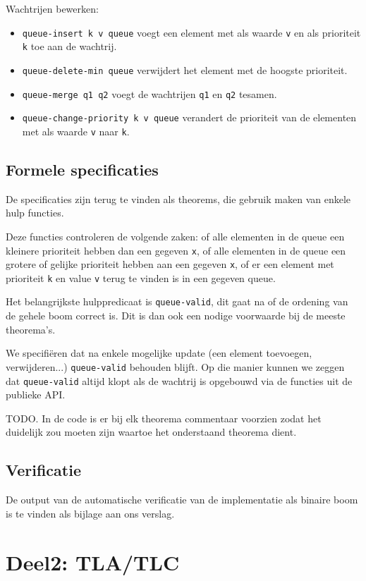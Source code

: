 \documentclass[a4paper,10pt]{article}
\begin{document}
Wachtrijen bewerken:

\begin{itemize}
    \item \texttt{queue-insert k v queue} voegt een element met als waarde
    \texttt{v} en als prioriteit \texttt{k} toe aan de wachtrij.
    \item \texttt{queue-delete-min queue} verwijdert het element met de hoogste
    prioriteit.
    \item \texttt{queue-merge q1 q2} voegt de wachtrijen \texttt{q1} en
    \texttt{q2} tesamen.
    \item \texttt{queue-change-priority k v queue} verandert de prioriteit van
    de elementen met als waarde \texttt{v} naar \texttt{k}.
\end{itemize}

\subsection{Formele specificaties}

De specificaties zijn terug te vinden als theorems, die gebruik maken van enkele
hulp functies.

Deze functies controleren de volgende zaken: of alle elementen in de queue een
kleinere prioriteit hebben dan een gegeven \texttt{x}, of alle elementen in de
queue een grotere of gelijke prioriteit hebben aan een gegeven \texttt{x}, of er
een element met prioriteit \texttt{k} en value \texttt{v} terug te vinden is in
een gegeven queue.

Het belangrijkste hulppredicaat is \texttt{queue-valid}, dit gaat na of de
ordening van de gehele boom correct is. Dit is dan ook een nodige voorwaarde bij
de meeste theorema's.

We specifi\"eren dat na enkele mogelijke update (een element toevoegen,
verwijderen...) \texttt{queue-valid} behouden blijft. Op die manier kunnen we
zeggen dat \texttt{queue-valid} altijd klopt als de wachtrij is opgebouwd via de
functies uit de publieke API.

TODO. In de code is er bij elk theorema commentaar voorzien zodat het duidelijk
zou moeten zijn waartoe het onderstaand theorema dient.

\subsection{Verificatie}

De output van de automatische verificatie van de implementatie als binaire boom
is te vinden als bijlage aan ons verslag.

\section{Deel2: TLA/TLC}
\end{document}
